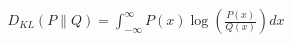 \documentclass[preview]{standalone}
\begin{document}
\begin{align*}
D_{KL}(P \| Q) = \int_{-\infty}^{\infty} P(x) \log \left( \frac{P(x)}{Q(x)} \right) dx
\end{align*}
\end{document}
